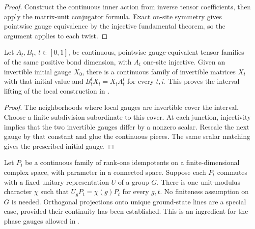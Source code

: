\begin{proof}\leanok
    Construct the continuous inner action from inverse tensor
    coefficients, then apply the matrix-unit conjugator formula.
    Exact on-site symmetry gives pointwise gauge equivalence by the
    injective fundamental theorem, so the argument applies to each twist.
\end{proof}

\begin{lemma}
    \label{thm:spt_global_virtual_gauge}
    \leanok

    Let $A_t,B_t$, $t\in[0,1]$, be continuous, pointwise
    gauge-equivalent tensor families of the same positive bond dimension,
    with $A_t$ one-site injective. Given an invertible initial gauge $X_0$,
    there is a continuous family of invertible matrices $X_t$ with that
    initial value and $B_t^iX_t=X_tA_t^i$ for every $t,i$.
    This proves the interval lifting of the local construction in
    \cite[Section~II.F.2]{Schuch2011Phases}.
\end{lemma}

\begin{proof}\leanok
    The neighborhoods where local gauges are invertible cover the
    interval. Choose a finite subdivision subordinate to this cover.
    At each junction, injectivity implies that the two invertible
    gauges differ by a nonzero scalar. Rescale the next gauge by that
    constant and glue the continuous pieces. The same scalar matching
    gives the prescribed initial gauge.
\end{proof}

\begin{lemma}
    \label{thm:spt_ground_line_character}
    \leanok
    Let $P_t$ be a continuous family of rank-one idempotents on a
    finite-dimensional complex space, with parameter in a connected
    space. Suppose each $P_t$ commutes with a fixed unitary representation
    $U$ of a group $G$. There is one unit-modulus character $\chi$ such that
    $U_gP_t=\chi(g)P_t$ for every $g,t$.
    No finiteness assumption on $G$ is needed. Orthogonal projections
    onto unique ground-state lines are a special case, provided their
    continuity has been established. This is an ingredient for the phase
    gauges allowed in \cite[Section~II.C.2 and Appendix~B]{Schuch2011Phases}.
\end{lemma}

